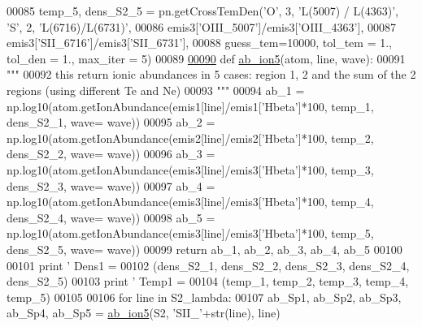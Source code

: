 \begin{DoxyCode}
00085 temp\_5, dens\_S2\_5 = pn.getCrossTemDen(\textcolor{stringliteral}{'O'}, 3, \textcolor{stringliteral}{'L(5007) / L(4363)'}, \textcolor{stringliteral}{'S'}, 2, \textcolor{stringliteral}{'L(6716)/L(6731)'}, 
00086                                       emis3[\textcolor{stringliteral}{'OIII\_5007'}]/emis3[\textcolor{stringliteral}{'OIII\_4363'}], 
00087                                       emis3[\textcolor{stringliteral}{'SII\_6716'}]/emis3[\textcolor{stringliteral}{'SII\_6731'}], 
00088                                       guess\_tem=10000, tol\_tem = 1., tol\_den = 1., max\_iter = 5)
00089 
\hypertarget{multi__comp_8py_source_l00090}{}\hyperlink{namespacepyneb_1_1test_1_1multi__comp_a0a9d531b17c5ee87e8657bdad8f8d715}{00090} \textcolor{keyword}{def }\hyperlink{namespacepyneb_1_1test_1_1multi__comp_a0a9d531b17c5ee87e8657bdad8f8d715}{ab\_ion5}(atom, line, wave):
00091     \textcolor{stringliteral}{"""}
00092 \textcolor{stringliteral}{    this return ionic abundances in 5 cases: region 1, 2 and the sum of the 2 regions (using different Te
       and Ne)}
00093 \textcolor{stringliteral}{    """}
00094     ab\_1 = np.log10(atom.getIonAbundance(emis1[line]/emis1[\textcolor{stringliteral}{'Hbeta'}]*100, temp\_1, dens\_S2\_1, wave= wave))
00095     ab\_2 = np.log10(atom.getIonAbundance(emis2[line]/emis2[\textcolor{stringliteral}{'Hbeta'}]*100, temp\_2, dens\_S2\_2, wave= wave))
00096     ab\_3 = np.log10(atom.getIonAbundance(emis3[line]/emis3[\textcolor{stringliteral}{'Hbeta'}]*100, temp\_3, dens\_S2\_3, wave= wave))
00097     ab\_4 = np.log10(atom.getIonAbundance(emis3[line]/emis3[\textcolor{stringliteral}{'Hbeta'}]*100, temp\_4, dens\_S2\_4, wave= wave))
00098     ab\_5 = np.log10(atom.getIonAbundance(emis3[line]/emis3[\textcolor{stringliteral}{'Hbeta'}]*100, temp\_5, dens\_S2\_5, wave= wave))
00099     \textcolor{keywordflow}{return} ab\_1, ab\_2, ab\_3, ab\_4, ab\_5
00100 
00101 \textcolor{keywordflow}{print} \textcolor{stringliteral}{'   Dens1 = %
00102     (dens\_S2\_1, dens\_S2\_2, dens\_S2\_3, dens\_S2\_4, dens\_S2\_5)
00103 \textcolor{keywordflow}{print} \textcolor{stringliteral}{'   Temp1 = %
00104     (temp\_1, temp\_2, temp\_3, temp\_4, temp\_5)
00105 
00106 \textcolor{keywordflow}{for} line \textcolor{keywordflow}{in} S2\_lambda:
00107     ab\_Sp1, ab\_Sp2, ab\_Sp3, ab\_Sp4, ab\_Sp5 = \hyperlink{namespacepyneb_1_1test_1_1multi__comp_a0a9d531b17c5ee87e8657bdad8f8d715}{ab\_ion5}(S2, \textcolor{stringliteral}{'SII\_'}+str(line), line)        
}}
\end{DoxyCode}
